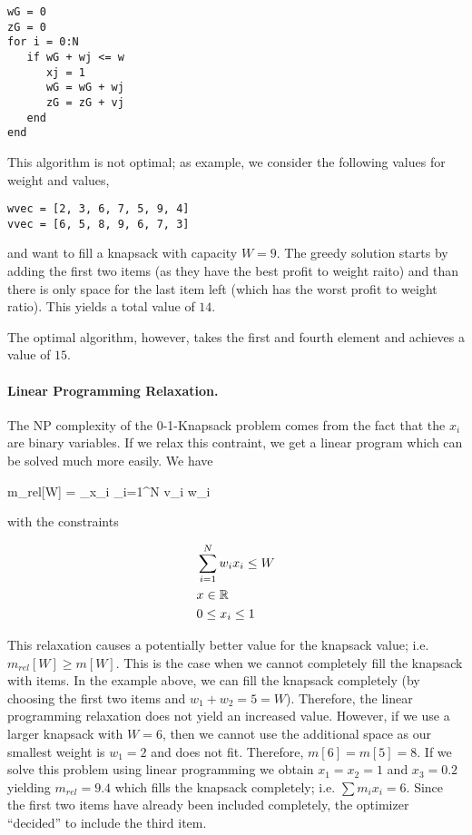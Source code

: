 \begin{verbatim}
wG = 0
zG = 0
for i = 0:N
   if wG + wj <= w
      xj = 1
      wG = wG + wj
      zG = zG + vj
   end
end
\end{verbatim}

This algorithm is not optimal; as example, we consider the following values for weight and values,

\begin{verbatim}
wvec = [2, 3, 6, 7, 5, 9, 4]
vvec = [6, 5, 8, 9, 6, 7, 3]
\end{verbatim}

and want to fill a knapsack with capacity $W = 9$. The greedy solution starts by adding the first two items (as they have the best profit to weight raito) and than there is only space for the last item left (which has the worst profit to weight ratio). This yields a total value of $14$.

The optimal algorithm, however, takes the first and fourth element and achieves a value of $15$.

\paragraph{Linear Programming Relaxation.} The NP complexity of the 0-1-Knapsack problem comes from the fact that the $x_i$ are binary variables. If we relax this contraint, we get a linear program which can be solved much more easily. We have

\bee
m_{rel}[W] = \max_{x_i} \sum_{i=1}^N v_i w_i
\eee

with the constraints

\begin{align*}
  & \sum_{i=1}^N w_i x_i \leq W \\
  & x \in \mathbb{R} \\
  & 0 \leq x_i \leq 1
\end{align*}

This relaxation causes a potentially better value for the knapsack value; i.e. $m_{rel}[W] \geq m[W]$. This is the case when we cannot completely fill the knapsack with items. In the example above, we can fill the knapsack completely (by choosing the first two items and $w_1 + w_2 = 5 = W$). Therefore, the linear programming relaxation does not yield an increased value. However, if we use a larger knapsack with $W = 6$, then we cannot use the additional space as our smallest weight is $w_1 = 2$ and does not fit. Therefore, $m[6] = m[5] = 8$. If we solve this problem using linear programming we obtain $x_1 = x_2 = 1$ and $x_3 = 0.2$ yielding $m_{rel} = 9.4$ which fills the knapsack completely; i.e. $\sum m_i x_i = 6$. Since the first two items have already been included completely, the optimizer ``decided'' to include the third item.

